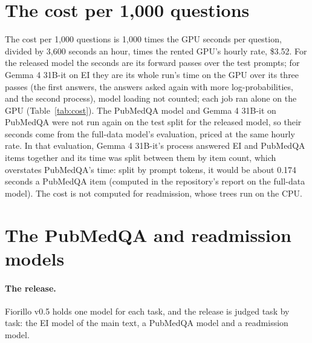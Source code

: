 \documentclass[11pt,letterpaper]{article}
\begin{document}
\section{The cost per 1,000 questions}
\label{app:cost}

The cost per 1,000 questions is 1,000 times the GPU seconds per question, divided by 3,600 seconds an hour, times the rented GPU's hourly rate, \$3.52. For the released model the seconds are its forward passes over the test prompts; for Gemma 4 31B-it on EI they are its whole run's time on the GPU over its three passes (the first answers, the answers asked again with more log-probabilities, and the second process), model loading not counted; each job ran alone on the GPU (Table~\ref{tab:cost}). The PubMedQA model and Gemma 4 31B-it on PubMedQA were not run again on the test split for the released model, so their seconds come from the full-data model's evaluation, priced at the same hourly rate. In that evaluation, Gemma 4 31B-it's process answered EI and PubMedQA items together and its time was split between them by item count, which overstates PubMedQA's time: split by prompt tokens, it would be about 0.174 seconds a PubMedQA item (computed in the repository's report on the full-data model). The cost is not computed for readmission, whose trees run on the CPU.

\begin{table}[H]
\centering\footnotesize
\caption{The GPU time per question and the cost per 1,000 questions at the rented GPU's rate, \$3.52 an hour. GPU is graphics processing unit. Gemma 4 31B-it's PubMedQA time is its share by item count in the full-data model's evaluation, which overstates it (see the text).}
\label{tab:cost}

\end{table}

\section{The PubMedQA and readmission models}
\label{app:other}

\paragraph{The release.} Fiorillo v0.5 holds one model for each task, and the release is judged task by task: the EI model of the main text, a PubMedQA model and a readmission model.
\end{document}

